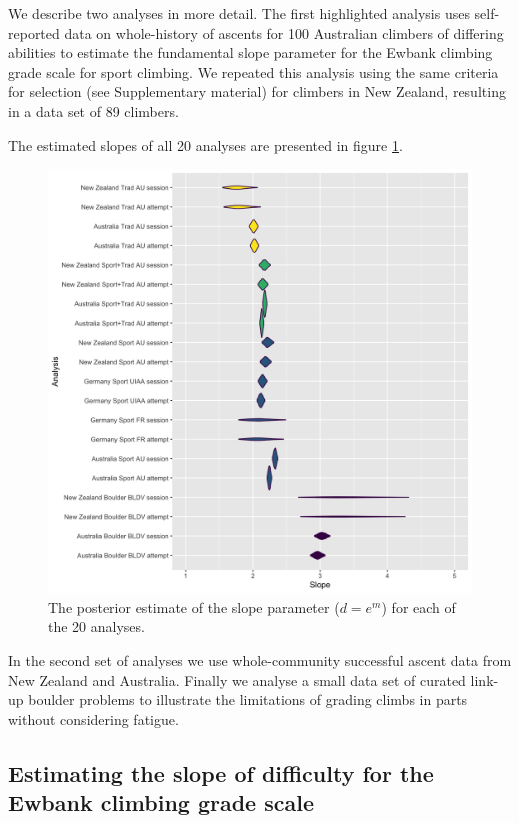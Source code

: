 \documentclass{article}
\begin{document}
We describe two analyses in more detail. The first highlighted analysis uses self-reported data on whole-history of ascents for 100 Australian climbers of differing abilities to estimate the fundamental slope parameter for the Ewbank climbing grade scale for sport climbing. We repeated this analysis using the same criteria for selection (see Supplementary material) for climbers in New Zealand, resulting in a data set of 89 climbers. 

The estimated slopes of all 20 analyses are presented in figure \ref{final-plot}.

\begin{figure}
\centering
\includegraphics[width=\textwidth]{../R/final-plot.png}
\caption{\small The posterior estimate of the slope parameter ($d=e^m$) for each of the 20 analyses.}
\label{final-plot}
\end{figure}

In the second set of analyses we use whole-community successful ascent data from New Zealand and Australia. Finally we analyse a small data set of curated link-up boulder problems to illustrate the limitations of grading climbs in parts without considering fatigue.

\subsection*{Estimating the slope of difficulty for the Ewbank climbing grade scale}
\end{document}
